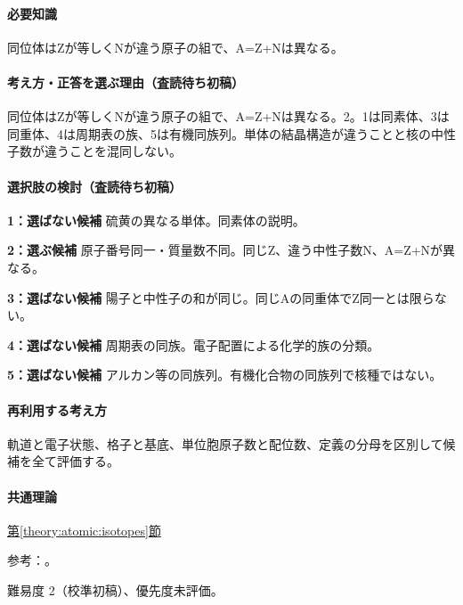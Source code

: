 \paragraph{必要知識} 同位体はZが等しくNが違う原子の組で、A=\allowbreak{}Z+Nは異なる。

\paragraph{考え方・正答を選ぶ理由（査読待ち初稿）} 同位体はZが等しくNが違う原子の組で、A=\allowbreak{}Z+Nは異なる。2。1は同素体、3は同重体、4は周期表の族、5は有機同族列。単体の結晶構造が違うことと核の中性子数が違うことを混同しない。

\paragraph{選択肢の検討（査読待ち初稿）}\mbox{}\par

\noindent\textbf{1：選ばない候補} 硫黄の異なる単体。同素体の説明。\par

\noindent\textbf{2：選ぶ候補} 原子番号同一・質量数不同。同じZ、違う中性子数N、A=\allowbreak{}Z+Nが異なる。\par

\noindent\textbf{3：選ばない候補} 陽子と中性子の和が同じ。同じAの同重体でZ同一とは限らない。\par

\noindent\textbf{4：選ばない候補} 周期表の同族。電子配置による化学的族の分類。\par

\noindent\textbf{5：選ばない候補} アルカン等の同族列。有機化合物の同族列で核種ではない。\par

\paragraph{再利用する考え方} 軌道と電子状態、格子と基底、単位胞原子数と配位数、定義の分母を区別して候補を全て評価する。

\paragraph{共通理論} \hyperref[theory:atomic:isotopes]{第\ref*{theory:atomic:isotopes}節}

\par 参考：\cite{modern_mit_nuclear}。

\par 難易度 2（校準初稿）、優先度未評価。
